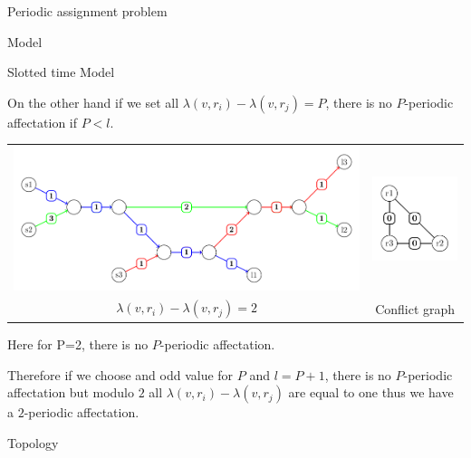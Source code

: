 \documentclass[a4paper,10pt]{report}
\begin{document}
\begin{chapter}{Periodic assignment problem}
\begin{section}{Model}
\begin{subsection}{Slotted time Model}
\begin{center}
{{On the other hand if we set all $\lambda(v,r_i) - \lambda(v,r_j)=P$, there is no $P$-periodic affectation if $P<l$.

\begin{tabular}{cc}
\includegraphics[scale=0.5]{Fig6.pdf} & \includegraphics[scale=1]{Fig8.pdf}\\
 $\lambda(v,r_i) - \lambda(v,r_j)=2$ & Conflict graph\\
\end{tabular}\newline
\begin{center}
 Here for P=2, there is no $P$-periodic affectation.
\end{center}

Therefore if we choose and odd value for $P$ and $l=P+1$, there is no $P$-periodic affectation but modulo $2$ all $\lambda(v,r_i) - \lambda(v,r_j)$
are equal to one thus we have a $2$-periodic affectation. 
}}

\end{center}

\end{subsection}
\begin{subsection}{Topology}


\end{subsection}
\end{section}
\end{chapter}
\end{document}
